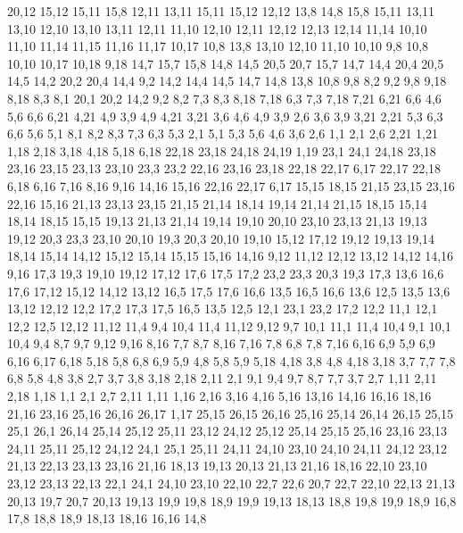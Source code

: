 20,12
15,12
15,11
15,8
%
12,11
13,11
15,11
15,12
12,12
%
13,8
14,8
15,8
15,11
13,11
13,10
%
12,10
13,10
13,11
12,11
%
11,10
12,10
12,11
12,12
12,13
12,14
11,14
%
10,10
11,10
11,14
11,15
11,16
11,17
10,17
%
10,8
13,8
13,10
12,10
11,10
10,10
%
9,8
10,8
10,10
10,17
10,18
9,18
%
14,7
15,7
15,8
14,8
%
14,5
20,5
20,7
15,7
14,7
%
14,4
20,4
20,5
14,5
%
14,2
20,2
20,4
14,4
%
9,2
14,2
14,4
14,5
14,7
14,8
13,8
10,8
9,8
%
8,2
9,2
9,8
9,18
8,18
8,3
%
8,1
20,1
20,2
14,2
9,2
8,2
%
7,3
8,3
8,18
7,18
%
6,3
7,3
7,18
7,21
6,21
6,6
%
4,6
5,6
6,6
6,21
4,21
4,9
%
3,9
4,9
4,21
3,21
%
3,6
4,6
4,9
3,9
%
2,6
3,6
3,9
3,21
2,21
%
5,3
6,3
6,6
5,6
%
5,1
8,1
8,2
8,3
7,3
6,3
5,3
%
2,1
5,1
5,3
5,6
4,6
3,6
2,6
%
1,1
2,1
2,6
2,21
1,21
1,18
2,18
3,18
4,18
5,18
6,18
22,18
23,18
24,18
24,19
1,19
%
23,1
24,1
24,18
23,18
23,16
23,15
23,13
23,10
23,3
23,2
%
22,16
23,16
23,18
22,18
22,17
%
6,17
22,17
22,18
6,18
%
6,16
7,16
8,16
9,16
14,16
15,16
22,16
22,17
6,17
%
15,15
18,15
21,15
23,15
23,16
22,16
15,16
%
21,13
23,13
23,15
21,15
21,14
%
18,14
19,14
21,14
21,15
18,15
%
15,14
18,14
18,15
15,15
%
19,13
21,13
21,14
19,14
%
19,10
20,10
23,10
23,13
21,13
19,13
19,12
%
20,3
23,3
23,10
20,10
%
19,3
20,3
20,10
19,10
%
15,12
17,12
19,12
19,13
19,14
18,14
15,14
%
14,12
15,12
15,14
15,15
15,16
14,16
%
9,12
11,12
12,12
13,12
14,12
14,16
9,16
%
17,3
19,3
19,10
19,12
17,12
17,6
17,5
%
17,2
23,2
23,3
20,3
19,3
17,3
%
13,6
16,6
17,6
17,12
15,12
14,12
13,12
%
16,5
17,5
17,6
16,6
%
13,5
16,5
16,6
13,6
%
12,5
13,5
13,6
13,12
12,12
%
12,2
17,2
17,3
17,5
16,5
13,5
12,5
%
12,1
23,1
23,2
17,2
12,2
%
11,1
12,1
12,2
12,5
12,12
11,12
11,4
%
9,4
10,4
11,4
11,12
9,12
9,7
%
10,1
11,1
11,4
10,4
%
9,1
10,1
10,4
9,4
%
8,7
9,7
9,12
9,16
8,16
%
7,7
8,7
8,16
7,16
7,8
%
6,8
7,8
7,16
6,16
6,9
%
5,9
6,9
6,16
6,17
6,18
5,18
%
5,8
6,8
6,9
5,9
%
4,8
5,8
5,9
5,18
4,18
%
3,8
4,8
4,18
3,18
%
3,7
7,7
7,8
6,8
5,8
4,8
3,8
%
2,7
3,7
3,8
3,18
2,18
2,11
%
2,1
9,1
9,4
9,7
8,7
7,7
3,7
2,7
%
1,11
2,11
2,18
1,18
%
1,1
2,1
2,7
2,11
1,11
1,16
2,16
3,16
4,16
5,16
13,16
14,16
16,16
18,16
21,16
23,16
25,16
26,16
26,17
1,17
%
25,15
26,15
26,16
25,16
%
25,14
26,14
26,15
25,15
%
25,1
26,1
26,14
25,14
25,12
25,11
%
23,12
24,12
25,12
25,14
25,15
25,16
23,16
23,13
%
24,11
25,11
25,12
24,12
%
24,1
25,1
25,11
24,11
24,10
%
23,10
24,10
24,11
24,12
23,12
%
21,13
22,13
23,13
23,16
21,16
%
18,13
19,13
20,13
21,13
21,16
18,16
%
22,10
23,10
23,12
23,13
22,13
%
22,1
24,1
24,10
23,10
22,10
22,7
22,6
%
20,7
22,7
22,10
22,13
21,13
20,13
%
19,7
20,7
20,13
19,13
19,9
19,8
%
18,9
19,9
19,13
18,13
%
18,8
19,8
19,9
18,9
%
16,8
17,8
18,8
18,9
18,13
18,16
16,16
%
14,8
